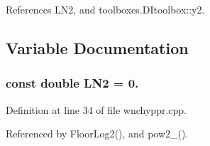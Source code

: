 References L\-N2, and toolboxes.\-D\-Itoolbox\-::y2.



\subsection{Variable Documentation}
\subsubsection[{L\-N2}]{\setlength{\rightskip}{0pt plus 5cm}const double L\-N2 = 0.\hspace{0.3cm}{\ttfamily [static]}}\label{toolboxes_2rnd_2wnchyppr_8cpp_aa4ae7c64775070011fae8d5610ae1a12}


Definition at line 34 of file wnchyppr.\-cpp.



Referenced by Floor\-Log2(), and pow2\-\_().

